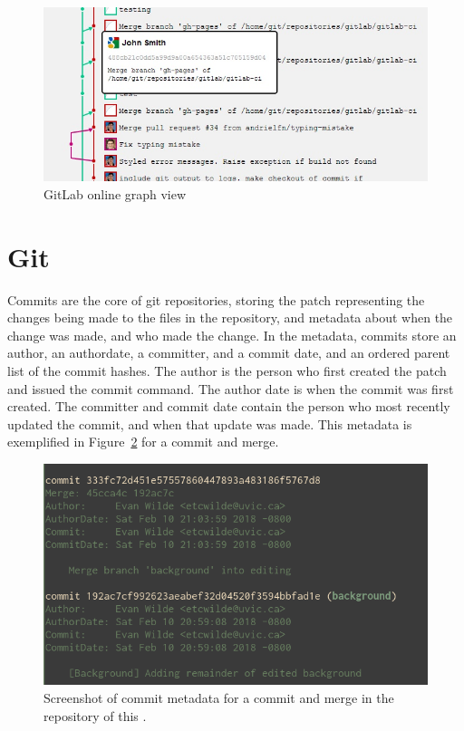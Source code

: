 \begin{figure}[htpb]
  \centering
  \includegraphics[width=0.8\linewidth]{Figures/introduction/gitlab_graph.jpg}
  \caption{GitLab online graph view\cite{gitlab}}
  \label{fig:gitlab_dag_screenshot}
\end{figure}

\section{Git}
\label{sec:git}

Commits are the core of git repositories, storing the patch
representing the changes being made to the files in the repository, and
metadata about when the change was made, and who made the change.
In the metadata, commits store an author, an authordate, a committer,
and a commit date, and an ordered parent list of the commit hashes.
The author is the person who first created the patch and issued the
commit command.
The author date is when the commit was first created.
The committer and commit date contain the person who most recently
updated the commit, and when that update was made.
This metadata is exemplified in Figure~\ref{fig:commit_metadata} for a
commit and merge.

\begin{figure}[htpb]
  \centering
  \includegraphics[width=0.8\linewidth]{Figures/background/commit_metadata.png}
  \caption{Screenshot of commit metadata for a commit and merge in the
    repository of this \paper{}.}
  \label{fig:commit_metadata}
\end{figure}

